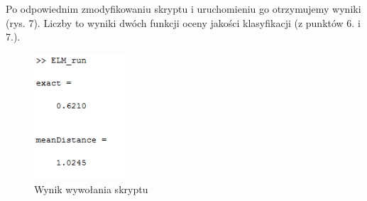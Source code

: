 \documentclass{article}
\begin{document}
Po odpowiednim zmodyfikowaniu skryptu i uruchomieniu go otrzymujemy wyniki (rys. 7). 
Liczby to wyniki dwóch funkcji oceny jakości klasyfikacji (z punktów 6. i 7.).
\begin{figure}[H]
\centering
\includegraphics[width=0.3\textwidth]{elm_results.png}
\caption{Wynik wywołania skryptu}
\end{figure}
\end{document}
